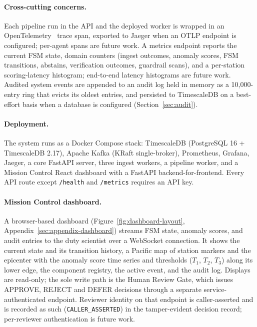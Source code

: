 \documentclass{article}
\begin{document}
\paragraph{Cross-cutting concerns.}
Each pipeline run in the API and the deployed worker is wrapped in an
OpenTelemetry~\citep{opentelemetry2024} trace span, exported to Jaeger
when an OTLP endpoint is configured; per-agent spans are future
work. A metrics endpoint reports the current FSM state, domain
counters (ingest outcomes, anomaly scores, FSM transitions, abstains,
verification outcomes, guardrail scans), and a per-station
scoring-latency histogram; end-to-end latency histograms are future
work. Audited system events are appended to an audit log held in
memory as a 10{,}000-entry ring that evicts its oldest entries, and
persisted to TimescaleDB on a best-effort basis when a database is
configured (Section~\ref{sec:audit}).

\paragraph{Deployment.}
The system runs as a Docker Compose stack: TimescaleDB (PostgreSQL 16 +
TimescaleDB 2.17), Apache Kafka (KRaft single-broker), Prometheus,
Grafana, Jaeger, a core FastAPI server, three ingest workers, a
pipeline worker, and a Mission Control React dashboard with a FastAPI
backend-for-frontend. Every API route except \texttt{/health} and
\texttt{/metrics} requires an API key.

\paragraph{Mission Control dashboard.}
A browser-based dashboard (Figure~\ref{fig:dashboard-layout},
Appendix~\ref{sec:appendix-dashboard}) streams FSM state, anomaly
scores, and audit entries to the duty scientist over a WebSocket
connection.  It shows the current state and its transition history, a
Pacific map of station markers and the epicenter with the anomaly
score time series and thresholds ($T_1$, $T_2$, $T_3$) along its lower
edge, the component registry, the active event, and the audit log.
Displays are read-only; the sole write path is the Human Review Gate,
which issues APPROVE, REJECT and DEFER decisions through a separate
service-authenticated endpoint. Reviewer identity on that
endpoint is caller-asserted and is recorded as such
(\texttt{CALLER\_ASSERTED}) in the tamper-evident decision record;
per-reviewer authentication is future work.
\end{document}

